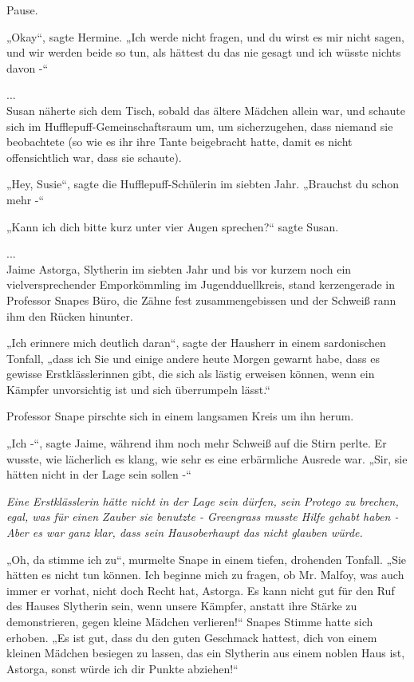 {Pause.

„Okay“, sagte Hermine. „Ich werde nicht fragen, und du wirst es mir nicht sagen, und wir werden beide so tun, als hättest du das nie gesagt und ich wüsste nichts davon -“

...\\ Susan näherte sich dem Tisch, sobald das ältere Mädchen allein war, und schaute sich im Hufflepuff-Gemeinschaftsraum um, um sicherzugehen, dass niemand sie beobachtete (so wie es ihr ihre Tante beigebracht hatte, damit es nicht offensichtlich war, dass sie schaute).

„Hey, Susie“, sagte die Hufflepuff-Schülerin im siebten Jahr. „Brauchst du schon mehr -“

„Kann ich dich bitte kurz unter vier Augen sprechen?“ sagte Susan.

...\\ Jaime Astorga, Slytherin im siebten Jahr und bis vor kurzem noch ein vielversprechender Emporkömmling im Jugendduellkreis, stand kerzengerade in Professor Snapes Büro, die Zähne fest zusammengebissen und der Schweiß rann ihm den Rücken hinunter.

„Ich erinnere mich deutlich daran“, sagte der Hausherr in einem sardonischen Tonfall, „dass ich Sie und einige andere heute Morgen gewarnt habe, dass es gewisse Erstklässlerinnen gibt, die sich als lästig erweisen können, wenn ein Kämpfer unvorsichtig ist und sich überrumpeln lässt.“

Professor Snape pirschte sich in einem langsamen Kreis um ihn herum.

„Ich -“, sagte Jaime, während ihm noch mehr Schweiß auf die Stirn perlte. Er wusste, wie lächerlich es klang, wie sehr es eine erbärmliche Ausrede war. „Sir, sie hätten nicht in der Lage sein sollen -“

\emph{Eine Erstklässlerin hätte nicht in der Lage sein dürfen, sein Protego zu brechen, egal, was für einen Zauber sie benutzte - Greengrass musste Hilfe gehabt haben - Aber es war ganz klar, dass sein Hausoberhaupt das nicht glauben würde.}

„Oh, da stimme ich zu“, murmelte Snape in einem tiefen, drohenden Tonfall. „Sie hätten es nicht tun können. Ich beginne mich zu fragen, ob Mr. Malfoy, was auch immer er vorhat, nicht doch Recht hat, Astorga. Es kann nicht gut für den Ruf des Hauses Slytherin sein, wenn unsere Kämpfer, anstatt ihre Stärke zu demonstrieren, gegen kleine Mädchen verlieren!“ Snapes Stimme hatte sich erhoben. „Es ist gut, dass du den guten Geschmack hattest, dich von einem kleinen Mädchen besiegen zu lassen, das ein Slytherin aus einem noblen Haus ist, Astorga, sonst würde ich dir Punkte abziehen!“

}

